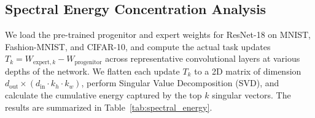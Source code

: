 \documentclass{article}
\theoremstyle{plain}
\theoremstyle{definition}
\theoremstyle{remark}
\begin{document}
\subsection{Spectral Energy Concentration Analysis}
\label{app:empirical_spectral_analysis}

We load the pre-trained progenitor and expert weights for ResNet-18 on MNIST, Fashion-MNIST, and CIFAR-10, and compute the actual task updates $T_k = W_{\text{expert}, k} - W_{\text{progenitor}}$ across representative convolutional layers at various depths of the network. We flatten each update $T_k$ to a 2D matrix of dimension $d_{\text{out}} \times (d_{\text{in}} \cdot k_h \cdot k_w)$, perform Singular Value Decomposition (SVD), and calculate the cumulative energy captured by the top $k$ singular vectors. The results are summarized in Table~\ref{tab:spectral_energy}.
\end{document}
